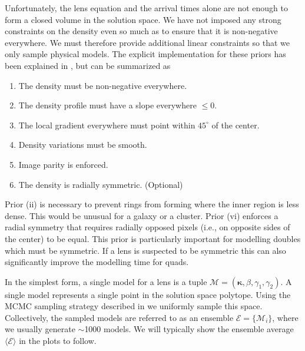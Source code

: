 \documentclass[galley,usenatbib]{mn2e}
\newcommand{\M}{\ensuremath{\mathscr{M}}}
\newcommand{\E}{\ensuremath{\mathscr{E}}}
\newcommand{\Eavg}{\ensuremath{\langle \E \rangle}}
\renewcommand{\vec}[1]{\ensuremath{\boldsymbol{#1}}}
\begin{document}
Unfortunately, the lens equation and the arrival times alone are not enough to form a
closed volume in the solution space. We have not imposed any strong constraints
on the density even so much as to ensure that it is non-negative everywhere. We
must therefore provide additional linear constraints so that we only sample
physical models. The explicit implementation for these priors has been
explained in \cite{}, but can be summarized as
\begin{enumerate}
\item The density must be non-negative everywhere.
\item The density profile must have a slope everywhere $\le 0$.
\item The local gradient everywhere must point within $45^{\circ}$ of the center.
\item Density variations must be smooth.
\item Image parity is enforced.
\item The density is radially symmetric. (Optional)
\end{enumerate}

Prior (ii) is necessary to prevent rings from forming where the inner region is
less dense. This would be unusual for a galaxy or a cluster. Prior (vi)
enforces a radial symmetry that requires radially opposed pixels (i.e., on
opposite sides of the center) to be equal. This prior is particularly important
for modelling doubles which must be symmetric. If a lens is suspected to be
symmetric this can also significantly improve the modelling time for quads.

In the simplest form, a single model for a lens is a tuple $\M = (\vec\kappa,
\beta, \gamma_1, \gamma_2)$. A single model represents a single point in the
solution space polytope. Using the MCMC sampling strategy described in \cite{}
we uniformly sample this space. Collectively, the sampled models are referred
to as an ensemble $\E = \{\M_i\}$, where we usually generate $\sim$1000 models. We
will typically show the ensemble average $\Eavg$ in the plots to
follow.
\end{document}
